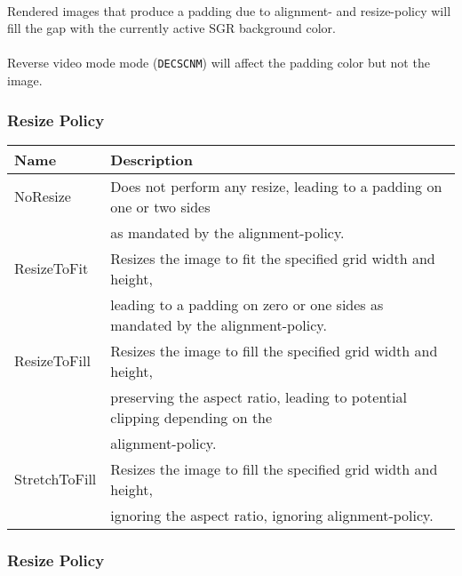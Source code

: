\documentclass{article}
\newcommand{\code}[1]{\colorbox{light-gray}{\texttt{#1}}}
\begin{document}
\paragraph*{}
Rendered images that produce a padding due to alignment- and resize-policy will fill the gap with the
currently active SGR background color.

\paragraph*{}
Reverse video mode mode (\code{DECSCNM}) will affect the padding color but not the image.

\subsubsection*{Resize Policy}

\begin{tabular}{ |l|l| }
    \hline
    \textbf{Name}          & \textbf{Description} \\
    \hline
    NoResize      & Does not perform any resize, leading to a padding on one or two sides \\
                  & as mandated by the alignment-policy. \\
    ResizeToFit   & Resizes the image to fit the specified grid width and height, \\
                  & leading to a padding on zero or one sides as mandated by the alignment-policy. \\
    ResizeToFill  & Resizes the image to fill the specified grid width and height, \\
                  & preserving the aspect ratio, leading to potential clipping depending on the \\
                  & alignment-policy. \\
    StretchToFill & Resizes the image to fill the specified grid width and height, \\
                  & ignoring the aspect ratio, ignoring alignment-policy. \\
    \hline
\end{tabular}

\subsubsection*{Resize Policy}
\end{document}
